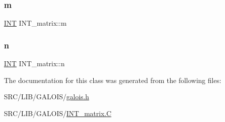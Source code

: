\subsubsection{\texorpdfstring{m}{m}}
{\footnotesize\ttfamily \mbox{\hyperlink{galois_8h_a09fddde158a3a20bd2dcadb609de11dc}{I\+NT}} I\+N\+T\+\_\+matrix\+::m}

\mbox{\label{class_i_n_t__matrix_a23dc7a503832dd0fa661d3e42f378742}} 
\subsubsection{\texorpdfstring{n}{n}}
{\footnotesize\ttfamily \mbox{\hyperlink{galois_8h_a09fddde158a3a20bd2dcadb609de11dc}{I\+NT}} I\+N\+T\+\_\+matrix\+::n}



The documentation for this class was generated from the following files\+:\begin{DoxyCompactItemize}
\item 
S\+R\+C/\+L\+I\+B/\+G\+A\+L\+O\+I\+S/\mbox{\hyperlink{galois_8h}{galois.\+h}}\item 
S\+R\+C/\+L\+I\+B/\+G\+A\+L\+O\+I\+S/\mbox{\hyperlink{_i_n_t__matrix_8_c}{I\+N\+T\+\_\+matrix.\+C}}\end{DoxyCompactItemize}
